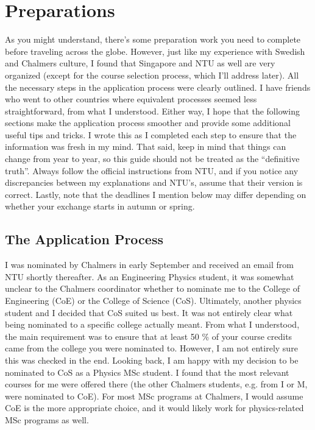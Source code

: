\chapter*{Preparations}
\vspace{-0.6cm}
As you might understand, there's some preparation work you need to complete before traveling across the globe. However, just like my experience with Swedish and Chalmers culture, I found that Singapore and NTU as well are very organized (except for the course selection process, which I'll address later). All the necessary steps in the application process were clearly outlined. I have friends who went to other countries where equivalent processes seemed less straightforward, from what I understood. Either way, I hope that the following sections make the application process smoother and provide some additional useful tips and tricks. I wrote this as I completed each step to ensure that the information was fresh in my mind. That said, keep in mind that things can change from year to year, so this guide should not be treated as the ``definitive truth''. Always follow the official instructions from NTU, and if you notice any discrepancies between my explanations and NTU's, assume that their version is correct. Lastly, note that the deadlines I mention below may differ depending on whether your exchange starts in autumn or spring.
\vspace{-0.25cm}
\section*{The Application Process}
\label{app}
I was nominated by Chalmers in early September and received an email from NTU shortly thereafter. As an Engineering Physics student, it was somewhat unclear to the Chalmers coordinator whether to nominate me to the College of Engineering (CoE) or the College of Science (CoS). Ultimately, another physics student and I decided that CoS suited us best. It was not entirely clear what being nominated to a specific college actually meant. From what I understood, the main requirement was to ensure that at least 50 \% of your course credits came from the college you were nominated to. However, I am not entirely sure this was checked in the end. Looking back, I am happy with my decision to be nominated to CoS as a Physics MSc student. I found that the most relevant courses for me were offered there (the other Chalmers students, e.g. from I or M, were nominated to CoE). For most MSc programs at Chalmers, I would assume CoE is the more appropriate choice, and it would likely work for physics-related MSc programs as well. 

